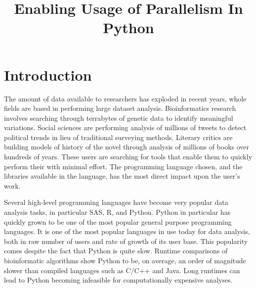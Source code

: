 \documentclass[conference]{IEEEtran}
\begin{document}
\title{Enabling Usage of Parallelism In Python}
\author{
}

\maketitle

\begin{abstract}

\end{abstract}

\section{Introduction}


The amount of data available to researchers has exploded in recent years,
whole fields are based in performing large dataset analysis.
Bioinformatics research involves searching through terrabytes of genetic data
to identify meaningful variations.\cite{bolstad2003comparison}
Social sciences are performing analysis of millions of tweets to detect political trends in lieu of traditional surveying methods. 
\cite{cody2016public}
Literary critics are building models of history of the novel through analysis of millions of books over hundreds of years.\cite{moretti2005graphs}
These users are searching for tools that enable them to quickly perform their 
with minimal effort.
The programming language chosen, and the libraries available in the language, 
has the most direct impact upon the user's work.

Several high-level programming languages have become very popular data analysis tasks, in particular SAS, R, and Python.\cite{kdnuggetSurvey}
Python in particular has quickly grown to be one of the most popular general purpose programming languages.
It is one of the most popular languages in use today for data 
analysis, both in raw number of users\cite{kdnuggetSurvey} and rate 
of growth of its user base.\cite{kdnuggetGrowthSurvey}
This popularity comes despite the fact that Python is quite slow.
Runtime comparisons of bioinformatic algorithms
show Python to be, on average, an order of magnitude slower than 
compiled languages such as C/C++ and Java.\cite{fourment2008comparison}
Long runtimes can lead to Python becoming infeasible
for computationally expensive analyses.
\end{document}
